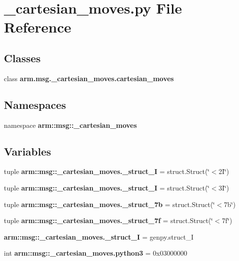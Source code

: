 \section{\-\_\-cartesian\-\_\-moves.\-py \-File \-Reference}
\label{__cartesian__moves_8py}
\subsection*{\-Classes}
\begin{DoxyCompactItemize}
\item 
class {\bf arm.\-msg.\-\_\-cartesian\-\_\-moves.\-cartesian\-\_\-moves}
\end{DoxyCompactItemize}
\subsection*{\-Namespaces}
\begin{DoxyCompactItemize}
\item 
namespace {\bf arm\-::msg\-::\-\_\-cartesian\-\_\-moves}
\end{DoxyCompactItemize}
\subsection*{\-Variables}
\begin{DoxyCompactItemize}
\item 
tuple {\bf arm\-::msg\-::\-\_\-cartesian\-\_\-moves.\-\_\-struct\-\_\-I} = struct.\-Struct(\char`\"{}$<$2\-I\char`\"{})
\item 
tuple {\bf arm\-::msg\-::\-\_\-cartesian\-\_\-moves.\-\_\-struct\-\_\-I} = struct.\-Struct(\char`\"{}$<$3\-I\char`\"{})
\item 
tuple {\bf arm\-::msg\-::\-\_\-cartesian\-\_\-moves.\-\_\-struct\-\_\-7b} = struct.\-Struct(\char`\"{}$<$7b\char`\"{})
\item 
tuple {\bf arm\-::msg\-::\-\_\-cartesian\-\_\-moves.\-\_\-struct\-\_\-7f} = struct.\-Struct(\char`\"{}$<$7f\char`\"{})
\item 
{\bf arm\-::msg\-::\-\_\-cartesian\-\_\-moves.\-\_\-struct\-\_\-\-I} = genpy.\-struct\-\_\-\-I
\item 
int {\bf arm\-::msg\-::\-\_\-cartesian\-\_\-moves.\-python3} = 0x03000000
\end{DoxyCompactItemize}
